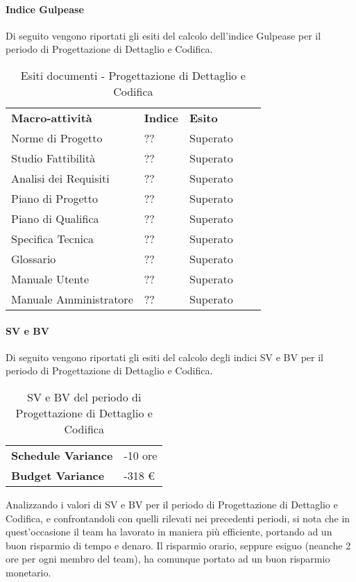 \paragraph*{Indice Gulpease}
Di seguito vengono riportati gli esiti del calcolo dell'indice Gulpease per il periodo di Progettazione di Dettaglio e Codifica.
\begin{table}[H]
			\centering
				\begin{tabular}{|l|l|l|ll}
					\cline{1-3}
					 \textbf{Macro-attività}  & \textbf{Indice \glossaryItem{Gulpease}}  & \textbf{Esito}  &  \\ \cline{1-3}
					 Norme di Progetto & ?? & Superato &  \\ \cline{1-3}
					 Studio Fattibilità & ?? & Superato &  \\ \cline{1-3}
					 Analisi dei Requisiti & ?? & Superato &  \\ \cline{1-3}
					 Piano di Progetto & ?? & Superato &  \\ \cline{1-3}
					 Piano di Qualifica & ?? & Superato &  \\ \cline{1-3}
					 Specifica Tecnica & ?? & Superato & \\ \cline{1-3}
					 Glossario & ?? & Superato &  \\ \cline{1-3}
					 Manuale Utente & ?? & Superato & \\ \cline{1-3}
					 Manuale Amministratore & ?? & Superato & \\ \cline{1-3}
				\end{tabular}
				\caption{Esiti  documenti - Progettazione di Dettaglio e Codifica}
		\end{table}
\paragraph*{SV e BV}
Di seguito vengono riportati gli esiti del calcolo degli indici SV e BV per il periodo di Progettazione di Dettaglio e Codifica.
\begin{table}[H]
\centering
\begin{tabular}{|l|l|}
\cline{1-2}
\textbf{Schedule Variance} & -10 ore \\ \cline{1-2}
\textbf{Budget Variance} & -318 \euro{} \\ \cline{1-2}
\end{tabular}
\caption{SV e BV del periodo di Progettazione di Dettaglio e Codifica}
\end{table}
Analizzando i valori di SV e BV per il periodo di Progettazione di Dettaglio e Codifica, e confrontandoli con quelli rilevati nei precedenti periodi, si nota che in quest'occasione il team ha lavorato in maniera più efficiente, portando ad un buon risparmio di tempo e denaro. Il risparmio orario, seppure esiguo (neanche 2 ore per ogni membro del team), ha comunque portato ad un buon risparmio monetario. \\
